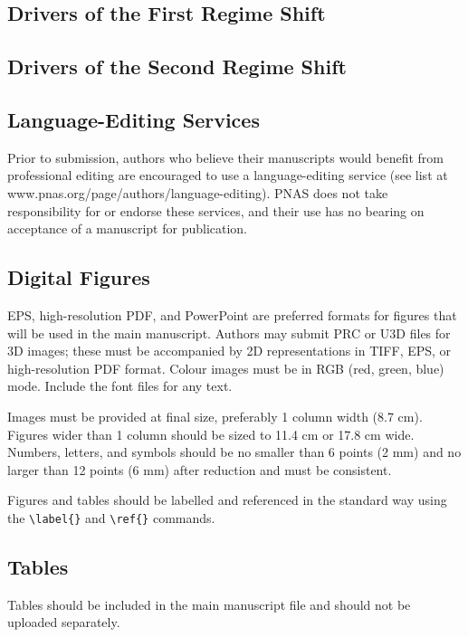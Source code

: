 \documentclass[9pt, twocolumn, twoside, lineno]{pnas-new}
\begin{document}
\subsection*{Drivers of the First Regime Shift}

\subsection*{Drivers of the Second Regime Shift}

\subsection*{Language-Editing Services}
Prior to submission, authors who believe their manuscripts would benefit from professional editing are encouraged to use a language-editing service (see list at www.pnas.org/page/authors/language-editing). PNAS does not take responsibility for or endorse these services, and their use has no bearing on acceptance of a manuscript for publication. 


\subsection*{Digital Figures}

EPS, high-resolution PDF, and PowerPoint are preferred formats for figures that will be used in the main manuscript. Authors may submit PRC or U3D files for 3D images; these must be accompanied by 2D representations in TIFF, EPS, or high-resolution PDF format. Colour images must be in RGB (red, green, blue) mode. Include the font files for any text.

Images must be provided at final size, preferably 1 column width (8.7 cm). Figures wider than 1 column should be sized to 11.4 cm or 17.8 cm wide. Numbers, letters, and symbols should be no smaller than 6 points (2 mm) and no larger than 12 points (6 mm) after reduction and must be consistent. 

Figures and tables should be labelled and referenced in the standard way using the \verb|\label{}| and \verb|\ref{}| commands.


\subsection*{Tables}
Tables should be included in the main manuscript file and should not be uploaded separately.
\end{document}
